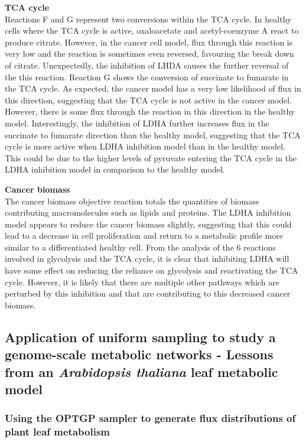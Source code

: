 \documentclass[10pt,letterpaper]{article}
\begin{document}
\textbf{TCA cycle} \\
Reactions F and G represent two conversions within the TCA cycle. In healthy cells where the TCA cycle is active, oxaloacetate and acetyl-coenzyme A react to produce citrate. However, in the cancer cell model, flux through this reaction is very low and the reaction is sometimes even reversed, favouring the break down of citrate. Unexpectedly, the inhibition of LHDA causes the further reversal of the this reaction. Reaction G shows the conversion of succinate to fumarate in the TCA cycle. As expected, the cancer model has a very low likelihood of flux in this direction, suggesting that the TCA cycle is not active in the cancer model. However, there is some flux through the reaction in this direction in the healthy model. Interestingly, the inhibition of LDHA further increases flux in the succinate to fumarate direction than the healthy model, suggesting that the TCA cycle is more active when LDHA inhibition model than in the healthy model. This could be due to the higher levels of pyruvate entering the TCA cycle in the LDHA inhibition model in comparison to the healthy model. 

\textbf{Cancer biomass} \\
The cancer biomass objective reaction totals the quantities of biomass contributing macromolecules such as lipids and proteins. The LDHA inhibition model appears to reduce the cancer biomass slightly, suggesting that this could lead to a decrease in cell proliferation and return to a metabolic profile more similar to a differentiated healthy cell. From the analysis of the 6 reactions involved in glycolysis and the TCA cycle, it is clear that inhibiting LDHA will have some effect on reducing the reliance on glycolysis and reactivating the TCA cycle. However, it is likely that there are multiple other pathways which are perturbed by this inhibition and that are contributing to this decreased cancer biomass. 

\subsection*{Application of uniform sampling to study a genome-scale metabolic networks - Lessons from an \textit{Arabidopsis thaliana} leaf metabolic model}

\subsubsection*{Using the OPTGP sampler to generate flux distributions of plant leaf metabolism}
\end{document}
